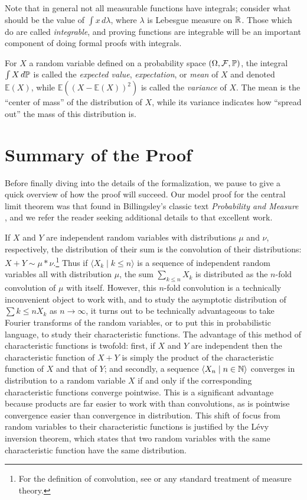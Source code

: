 \documentclass{article}
\theoremstyle{definition}
\newcommand{\bldseq}[2]{\langle{#1}\mid{#2}\rangle}
\renewcommand{\E}{\mathbb E}
\begin{document}
Note that in general not all measurable functions have integrals; consider what should be the value of $\int x \, d\lambda$, where $\lambda$ is Lebesgue measure on $\R$. Those which do are called {\em integrable}, and proving functions are integrable will be an important component of doing formal proofs with integrals.

For $X$ a random variable defined on a probability space $(\Omega, \mathcal F, \P)$, the integral $\int X \, d\P$ is called the {\em expected value}, {\em expectation}, or {\em mean} of $X$ and denoted $\E(X)$, while $\E((X - \E(X))^2)$ is called the {\em variance} of $X$. The mean is the ``center of mass'' of the distribution of $X$, while its variance indicates how ``spread out'' the mass of this distribution is.

\section{Summary of the Proof} \label{sec:summary}

Before finally diving into the details of the formalization, we pause to give a quick overview of how the proof will succeed. Our model proof for the central limit theorem was that found in Billingsley's classic text {\em Probability and Measure} \cite{billingsley}, and we refer the reader seeking additional details to that excellent work.

If $X$ and $Y$ are independent random variables with distributions $\mu$ and $\nu$, respectively, the distribution of their sum is the convolution of their distributions: $X + Y \sim \mu * \nu$.\footnote{For the definition of convolution, see \cite{billingsley} or any standard treatment of measure theory.} Thus if $\bldseq{X_k}{k \le n}$ is a sequence of independent random variables all with distribution $\mu$, the sum $\sum_{k \le n} X_k$ is distributed as the $n$-fold convolution of $\mu$ with itself. However, this $n$-fold convolution is a technically inconvenient object to work with, and to study the asymptotic distribution of $\sum{k \le n} X_k$ as $n \rightarrow \infty$, it turns out to be technically advantageous to take Fourier transforms of the random variables, or to put this in probabilistic language, to study their characteristic functions. The advantage of this method of characteristic functions is twofold: first, if $X$ and $Y$ are independent then the characteristic function of $X + Y$ is simply the product of the characteristic function of $X$ and that of $Y$; and secondly, a sequence $\bldseq{X_n}{n \in \N}$ converges in distribution to a random variable $X$ if and only if the corresponding characteristic functions converge pointwise. This is a significant advantage because products are far easier to work with than convolutions, as is pointwise convergence easier than convergence in distribution. This shift of focus from random variables to their characteristic functions is justified by the L\'evy inversion theorem, which states that two random variables with the same characteristic function have the same distribution.
\end{document}
